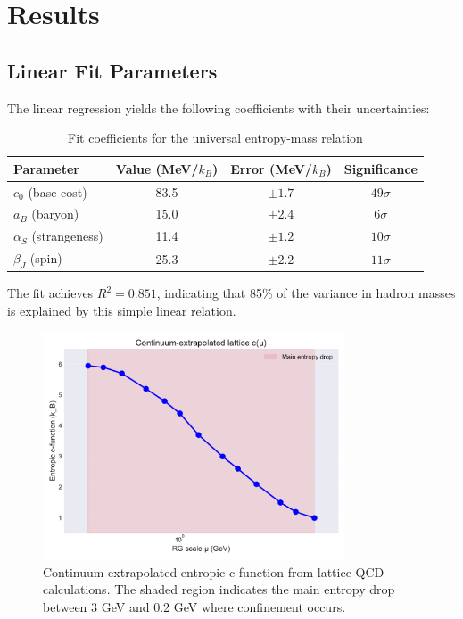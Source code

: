 \documentclass[12pt,a4paper]{article}
\begin{document}
\section{Results}

\subsection{Linear Fit Parameters}

The linear regression yields the following coefficients with their uncertainties:

\begin{table}[H]
\centering
\caption{Fit coefficients for the universal entropy-mass relation}
\label{tab:coefficients}
\begin{tabular}{lccc}
\toprule
Parameter & Value (MeV/$k_B$) & Error (MeV/$k_B$) & Significance \\
\midrule
$c_0$ (base cost) & 83.5 & $\pm 1.7$ & $49\sigma$ \\
$a_B$ (baryon) & 15.0 & $\pm 2.4$ & $6\sigma$ \\
$\alpha_S$ (strangeness) & 11.4 & $\pm 1.2$ & $10\sigma$ \\
$\beta_J$ (spin) & 25.3 & $\pm 2.2$ & $11\sigma$ \\
\bottomrule
\end{tabular}
\end{table}

The fit achieves $R^2 = 0.851$, indicating that 85\% of the variance in hadron masses is explained by this simple linear relation.

\begin{figure}[H]
\centering
\includegraphics[width=0.8\textwidth]{figures/c_function.pdf}
\caption{Continuum-extrapolated entropic c-function from lattice QCD calculations. The shaded region indicates the main entropy drop between 3 GeV and 0.2 GeV where confinement occurs.}
\label{fig:cfunction}
\end{figure}
\end{document}

